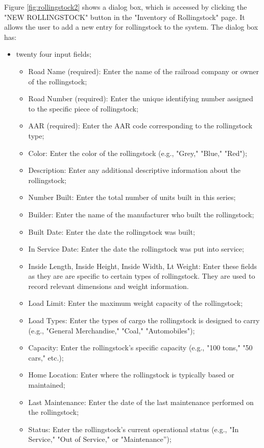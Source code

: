 Figure \ref{fig:rollingstock2} shows a dialog box, which is accessed by clicking the "NEW ROLLINGSTOCK" button in the "Inventory of Rollingstock" page. It allows the user to add 
a new entry for rollingstock to the system. The dialog box has:
\begin{itemize}
    \item twenty four input fields;
    \begin{itemize}
        \item Road Name (required): Enter the name of the railroad company or owner of the rollingstock;
        \item Road Number (required): Enter the unique identifying number assigned to the specific piece of rollingstock;
        \item AAR (required): Enter the AAR code corresponding to the rollingstock type;
        \item Color: Enter the color of the rollingstock (e.g., "Grey," "Blue," "Red");
        \item Description: Enter any additional descriptive information about the rollingstock;
        \item Number Built: Enter the total number of units built in this series;
        \item Builder: Enter the name of the manufacturer who built the rollingstock;
        \item Built Date: Enter the date the rollingstock was built;
        \item In Service Date: Enter the date the rollingstock was put into service;
        \item Inside Length, Inside Height, Inside Width, Lt Weight: Enter these fields as they are are specific to certain types of rollingstock. They are used to record relevant dimensions and weight information.
        \item Load Limit: Enter the maximum weight capacity of the rollingstock;
        \item Load Types: Enter the types of cargo the rollingstock is designed to carry (e.g., "General Merchandise," "Coal," "Automobiles");
        \item Capacity: Enter the rollingstock's specific capacity (e.g., "100 tons," "50 cars," etc.);
        \item Home Location: Enter where the rollingstock is typically based or maintained;
        \item Last Maintenance: Enter the date of the last maintenance performed on the rollingstock;
        \item Status: Enter the rollingstock's current operational status (e.g., "In Service," "Out of Service," or "Maintenance”);

\end{itemize}
\end{itemize}
